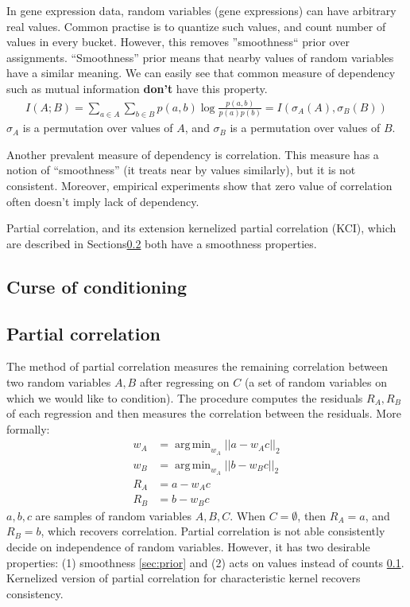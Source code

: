 \documentclass{article} %
\DeclareMathOperator*{\argmin}{arg\,min}
\begin{document}
In gene expression data, random variables (gene expressions) can 
have arbitrary real values. Common practise is to quantize such values,
and count number of values in every bucket. However, this removes 
''smoothness`` prior over assignments. ``Smoothness'' prior means that
nearby values of random variables have a similar meaning. We can easily see
that common measure of dependency such as mutual information {\bf don't} have 
this property. 
\begin{align*}
  I(A;B)=\sum_{a \in A}\sum_{b \in B} p(a, b)\log{\frac{p(a, b)}{p(a)p(b)}}=I(\sigma_A(A), \sigma_B(B))
\end{align*}
$\sigma_A$ is a permutation over values of $A$, and $\sigma_B$ is
a permutation over values of $B$.



Another prevalent measure of dependency is correlation. This measure
has a notion of ``smoothness'' (it treats near by values similarly), but
it is not consistent. Moreover, empirical experiments show that zero value
of correlation often doesn't imply lack of dependency. 

Partial correlation, and its extension kernelized partial correlation (KCI), which are described 
in Sections\ref{sec:corr} both have a smoothness properties.


\subsection{Curse of conditioning}\label{sec:curse}

\subsection{Partial correlation}\label{sec:corr}
The method of partial correlation measures the remaining correlation between two random variables $A, B$ after regressing on $C$ (a set of random 
variables on which we would like to condition).  The procedure computes the residuals $R_A, R_B$ of each regression and then measures the correlation between the residuals. More formally:
\begin{align*}
  w_A &= \argmin_{w_A} ||a - w_A c||_{2} \\
  w_B &= \argmin_{w_A} ||b - w_B c||_{2} \\
  R_A &= a - w_A c \\
  R_B &= b - w_B c
\end{align*}
$a, b, c$ are samples of random variables $A, B, C$. When $C = \emptyset$, then $R_A = a$, and $R_B = b$, which
recovers correlation. Partial correlation is not able consistently decide
on independence of random variables. However, it has two desirable properties: (1) smoothness \ref{sec:prior} and (2)
acts on values instead of counts \ref{sec:curse}. Kernelized version of partial correlation for 
characteristic kernel recovers consistency.
\end{document}
